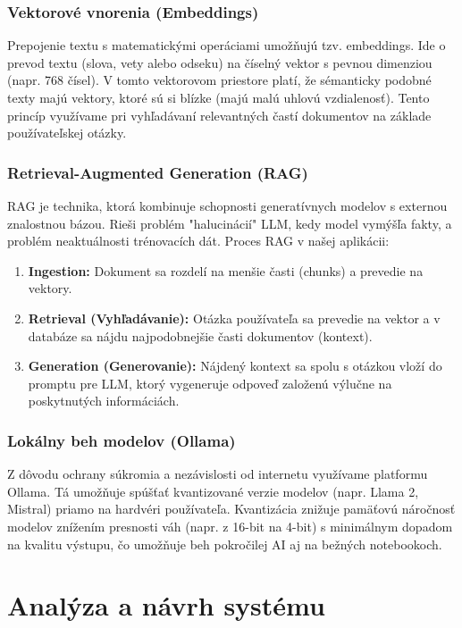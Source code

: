 \documentclass[12pt, a4paper]{article}
\begin{document}
\begin{titlepage}
\subsubsection{Vektorové vnorenia (Embeddings)}
Prepojenie textu s matematickými operáciami umožňujú tzv. embeddings. Ide o prevod textu (slova, vety alebo odseku) na číselný vektor s pevnou dimenziou (napr. 768 čísel). V tomto vektorovom priestore platí, že sémanticky podobné texty majú vektory, ktoré sú si blízke (majú malú uhlovú vzdialenosť). Tento princíp využívame pri vyhľadávaní relevantných častí dokumentov na základe používateľskej otázky.

\subsubsection{Retrieval-Augmented Generation (RAG)}
RAG je technika, ktorá kombinuje schopnosti generatívnych modelov s externou znalostnou bázou. Rieši problém "halucinácií" LLM, kedy model vymýšľa fakty, a problém neaktuálnosti trénovacích dát.
Proces RAG v našej aplikácii:
\begin{enumerate}
    \item \textbf{Ingestion:} Dokument sa rozdelí na menšie časti (chunks) a prevedie na vektory.
    \item \textbf{Retrieval (Vyhľadávanie):} Otázka používateľa sa prevedie na vektor a v databáze sa nájdu najpodobnejšie časti dokumentov (kontext).
    \item \textbf{Generation (Generovanie):} Nájdený kontext sa spolu s otázkou vloží do promptu pre LLM, ktorý vygeneruje odpoveď založenú výlučne na poskytnutých informáciách.
\end{enumerate}

\subsubsection{Lokálny beh modelov (Ollama)}
Z dôvodu ochrany súkromia a nezávislosti od internetu využívame platformu Ollama. Tá umožňuje spúšťať kvantizované verzie modelov (napr. Llama 2, Mistral) priamo na hardvéri používateľa. Kvantizácia znižuje pamäťovú náročnosť modelov znížením presnosti váh (napr. z 16-bit na 4-bit) s minimálnym dopadom na kvalitu výstupu, čo umožňuje beh pokročilej AI aj na bežných notebookoch.

\newpage
\section{Analýza a návrh systému}


\end{titlepage}
\end{document}
